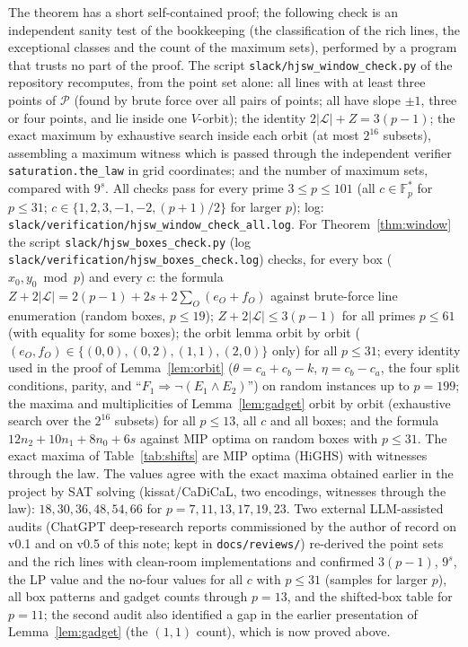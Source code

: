 \documentclass[11pt]{article}
\theoremstyle{remark}
\newcommand{\Fp}{\mathbb{F}_p}
\newcommand{\Lc}{\mathcal{L}}
\newcommand{\Pset}{\mathcal{P}}
\begin{document}
The theorem has a short self-contained proof; the following check is an independent sanity test of the bookkeeping
(the classification of the rich lines, the exceptional classes and the count of the maximum sets), performed by a
program that trusts no part of the proof.  The script \texttt{slack/hjsw\_window\_check.py} of the repository
recomputes, from the point set alone: all lines with at least three points of $\Pset$ (found by brute force over all
pairs of points; all have slope $\pm1$, three or four points, and lie inside one $V$-orbit); the identity
$2|\Lc|+Z=3(p-1)$; the exact maximum by exhaustive search inside each orbit (at most $2^{16}$ subsets), assembling a
maximum witness which is passed through the independent verifier \texttt{saturation.the\_law} in grid coordinates; and
the number of maximum sets, compared with $9^{s}$.  All checks pass for every prime $3\le p\le101$ (all $c\in\Fp^*$ for
$p\le31$; $c\in\{1,2,3,-1,-2,(p+1)/2\}$ for larger $p$); log: \texttt{slack/verification/hjsw\_window\_check\_all.log}.  For Theorem~\ref{thm:window} the script \texttt{slack/hjsw\_boxes\_check.py} (log \texttt{slack/verification/hjsw\_boxes\_check.log})
checks, for every box ($x_0,y_0\bmod p$) and every $c$: the formula $Z+2|\Lc|=2(p-1)+2s+2\sum_O(e_O+f_O)$ against brute-force
line enumeration (random boxes, $p\le19$); $Z+2|\Lc|\le3(p-1)$ for all primes $p\le61$ (with equality for some boxes); the
orbit lemma orbit by orbit ($(e_O,f_O)\in\{(0,0),(0,2),(1,1),(2,0)\}$ only) for all $p\le31$; every identity used in the
proof of Lemma~\ref{lem:orbit} ($\theta=c_a+c_b-k$, $\eta=c_b-c_a$, the four split conditions, parity, and
``$F_1\Rightarrow\neg(E_1\wedge E_2)$'') on random instances up to $p=199$; the maxima and multiplicities of
Lemma~\ref{lem:gadget} orbit by orbit (exhaustive search over the $2^{16}$ subsets) for all $p\le13$, all $c$ and all boxes;
and the formula $12n_2+10n_1+8n_0+6s$ against MIP optima on random boxes with $p\le31$.  The exact maxima of Table~\ref{tab:shifts}
are MIP optima (HiGHS) with witnesses through the law.  The values
agree with the exact maxima obtained earlier in the project by SAT solving (kissat/CaDiCaL, two encodings, witnesses
through the law): $18,30,36,48,54,66$ for $p=7,11,13,17,19,23$.  Two external LLM-assisted audits (ChatGPT deep-research
reports commissioned by the author of record on v0.1 and on v0.5 of this note; kept in \texttt{docs/reviews/}) re-derived
the point sets and the rich lines with clean-room implementations and confirmed $3(p-1)$, $9^s$, the LP value and the
no-four values for all $c$ with $p\le31$ (samples for larger $p$), all box patterns and gadget counts through $p=13$, and
the shifted-box table for $p=11$; the second audit also identified a gap in the earlier presentation of
Lemma~\ref{lem:gadget} (the $(1,1)$ count), which is now proved above.
\end{document}
